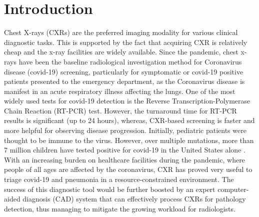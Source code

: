 \documentclass[10pt,journal,compsoc]{IEEEtran}
\begin{document}
\section{Introduction}
Chest X-rays (CXRs) are the preferred imaging modality for various clinical diagnostic tasks. This is supported by the fact that acquiring CXR is relatively cheap and the x-ray facilities are widely available. Since the pandemic, chest x-rays have been the baseline radiological investigation method for Coronavirus disease (covid-19) screening, particularly for symptomatic or covid-19 positive patients presented to the emergency department, as the Coronavirus disease is manifest in an acute respiratory illness affecting the lungs.  
One of the most widely used tests for covid-19 detection is the Reverse Transcription-Polymerase Chain Reaction (RT-PCR) test. However, the turnaround time for RT-PCR results is significant (up to 24 hours), whereas, CXR-based screening is faster and more helpful for observing disease progression. Initially, pediatric patients were thought to be immune to the virus. However, over multiple mutations, more than 7 million children have tested positive for covid-19 in the United States alone \cite{zachariah2022covid}. With an increasing burden on healthcare facilities during the pandemic, where people of all ages are affected by the coronavirus, CXR has proved very useful to triage covid-19 and pneumonia in a resource-constrained environment. The success of this diagnostic tool would be further boosted by an expert computer-aided diagnosis (CAD) system that can effectively process CXRs for pathology detection, thus managing to mitigate the growing workload for radiologists.   
\end{document}
